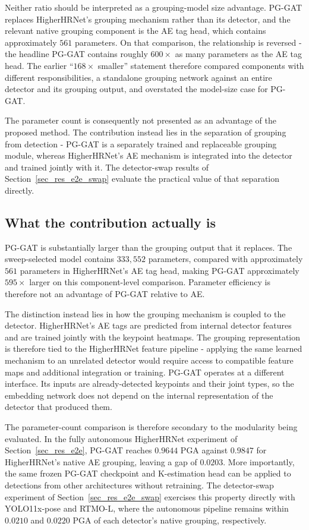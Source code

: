 Neither ratio should be interpreted as a grouping-model size advantage.
PG-GAT replaces HigherHRNet's grouping mechanism rather than its
detector,
and the relevant native grouping component is the AE tag head,
which contains approximately $561$ parameters.
On that comparison, the relationship is reversed -
the headline PG-GAT contains roughly $600\times$ as many parameters
as the AE tag head.
The earlier ``$168\times$ smaller'' statement therefore compared
components with different responsibilities,
a standalone grouping network against an entire detector and its
grouping output,
and overstated the model-size case for PG-GAT.

The parameter count is consequently not presented as an advantage of
the proposed method.
The contribution instead lies in the separation of grouping from
detection -
PG-GAT is a separately trained and replaceable grouping module,
whereas HigherHRNet's AE mechanism is integrated into the detector
and trained jointly with it.
The detector-swap results of Section~\ref{sec_res_e2e_swap}
evaluate the practical value of that separation directly.

\subsection{What the contribution actually is}
\label{sec_res_model_size_contribution}

PG-GAT is substantially larger than the grouping output that it
replaces.
The sweep-selected model contains $333{,}552$ parameters,
compared with approximately $561$ parameters in HigherHRNet's AE tag
head,
making PG-GAT approximately $595\times$ larger on this component-level
comparison.
Parameter efficiency is therefore not an advantage of PG-GAT relative
to AE.

The distinction instead lies in how the grouping mechanism is coupled
to the detector.
HigherHRNet's AE tags are predicted from internal detector features
and are trained jointly with the keypoint heatmaps.
The grouping representation is therefore tied to the HigherHRNet
feature pipeline -
applying the same learned mechanism to an unrelated detector would
require access to compatible feature maps and additional integration
or training.
PG-GAT operates at a different interface.
Its inputs are already-detected keypoints and their joint types,
so the embedding network does not depend on the internal representation
of the detector that produced them.

The parameter-count comparison is therefore secondary to the
modularity being evaluated.
In the fully autonomous HigherHRNet experiment of
Section~\ref{sec_res_e2e},
PG-GAT reaches $0.9644$ PGA against $0.9847$ for HigherHRNet's native
AE grouping,
leaving a gap of $0.0203$.
More importantly, the same frozen PG-GAT checkpoint and K-estimation
head can be applied to detections from other architectures without
retraining.
The detector-swap experiment of Section~\ref{sec_res_e2e_swap}
exercises this property directly with YOLO11x-pose and RTMO-L,
where the autonomous pipeline remains within $0.0210$ and $0.0220$ PGA
of each detector's native grouping, respectively.

